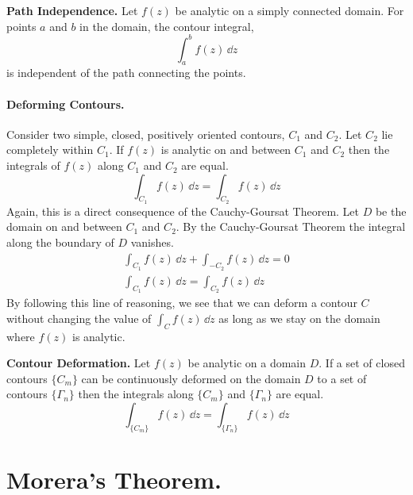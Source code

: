 \begin{Result}
  \textbf{Path Independence.}
  Let $f(z)$ be analytic on a simply connected domain.  For points 
  $a$ and $b$ in the domain, the contour integral,
  \[
  \int_a^b f(z)\,\dd z
  \]
  is independent of the path connecting the points.
\end{Result}



\paragraph{Deforming Contours.}
Consider two simple, closed, positively oriented contours, $C_1$ and $C_2$.  
Let $C_2$ lie completely within $C_1$.  If $f(z)$ is analytic on and between
$C_1$ and $C_2$ then the integrals of $f(z)$ along $C_1$ and $C_2$ are equal.
\[
\int_{C_1} f(z)\,\dd z = \int_{C_2} f(z)\,\dd z
\]
Again, this is a direct consequence of the Cauchy-Goursat Theorem.
Let $D$ be the domain on and between $C_1$ and $C_2$.  By the Cauchy-Goursat
Theorem the integral along the boundary of $D$ vanishes.
\begin{gather*}
  \int_{C_1} f(z)\,\dd z + \int_{-C_2} f(z)\,\dd z = 0
  \\
  \int_{C_1} f(z)\,\dd z = \int_{C_2} f(z)\,\dd z
\end{gather*}
By following this line of reasoning, we see that we can deform a contour
$C$ without changing the value of $\int_C f(z)\,\dd z$ as long as we stay on 
the domain where $f(z)$ is analytic.




\begin{Result}
  \textbf{Contour Deformation.}
  Let $f(z)$ be analytic on a domain $D$.   If a set of closed contours 
  $\{ C_m \}$ can be continuously deformed on the domain $D$ to a set of 
  contours $\{ \Gamma_n \}$ then the integrals along $\{ C_m \}$ and $\{ \Gamma_n \}$ are equal.
  \[
  \int_{\{C_m\}} f(z)\,\dd z = \int_{\{\Gamma_n\}} f(z)\,\dd z
  \]
\end{Result}















\section{Morera's Theorem.}




